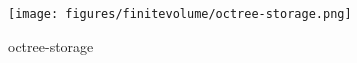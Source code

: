 \begin{figure}[ht]
    \centering
    \texttt{[image: figures/finitevolume/octree-storage.png]}
    \caption{octree-storage}
    \label{fig:octree-storage}
\end{figure}
